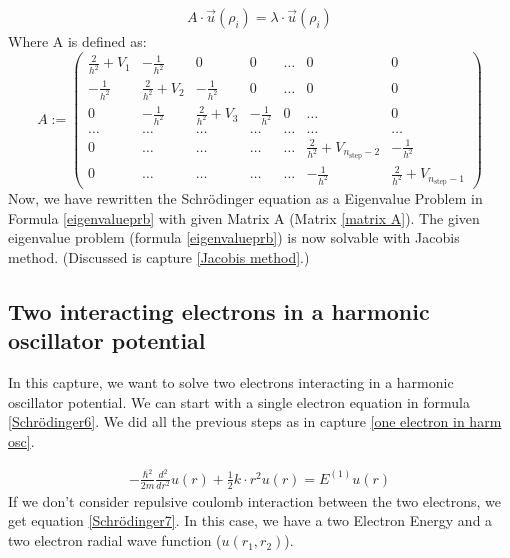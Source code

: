 \documentclass[10pt,a4paper]{article}
\begin{document}
\begin{align}
 A \cdot \vec{u}(\rho_i)  = \lambda \cdot \vec{u}(\rho_i) \label{eigenvalueprb}
\end{align}
Where A is defined as:
\begin{equation}
  A:=  \left( \begin{array}{ccccccc} \frac{2}{h^2}+V_1 & -\frac{1}{h^2} & 0   & 0    & \dots  &0     & 0 \\
                                -\frac{1}{h^2} & \frac{2}{h^2}+V_2 & -\frac{1}{h^2} & 0    & \dots  &0     &0 \\
                                0   & -\frac{1}{h^2} & \frac{2}{h^2}+V_3 & -\frac{1}{h^2}  &0       &\dots & 0\\
                                \dots  & \dots & \dots & \dots  &\dots      &\dots & \dots\\
                                0   & \dots & \dots & \dots  &\dots       &\frac{2}{h^2}+V_{n_{\mathrm{step}}-2} & -\frac{1}{h^2}\\
                                0   & \dots & \dots & \dots  &\dots       &-\frac{1}{h^2} & \frac{2}{h^2}+V_{n_{\mathrm{step}}-1}

             \end{array} \right)  \label{matrix A}
\end{equation} 
Now, we have rewritten the Schrödinger equation as a Eigenvalue Problem in Formula \ref{eigenvalueprb} with given Matrix A (Matrix \ref{matrix A}). The given eigenvalue problem (formula \ref{eigenvalueprb}) is now solvable with Jacobis method. (Discussed is capture  \ref{Jacobis method}.)

\subsection{Two interacting electrons in a harmonic oscillator potential}

In this capture, we want to solve two electrons interacting in a harmonic oscillator potential.
We can start with a single electron equation in formula \ref{Schrödinger6}. We did all the previous steps as in capture  \ref{one electron in harm osc}. 

\begin{align}
-\frac{\hbar^2}{2 m}  \frac{d^2}{dr^2} u(r)+ \frac{1}{2}k \cdot r^2 u(r)= E^{(1)} u(r) \label{Schrödinger6}
\end{align}
If we don't consider repulsive coulomb interaction between the two electrons, we get equation \ref{Schrödinger7}. In this case, we have a two Electron Energy and a two electron radial wave function ($u(r_1,r_2)$). 
\end{document}
